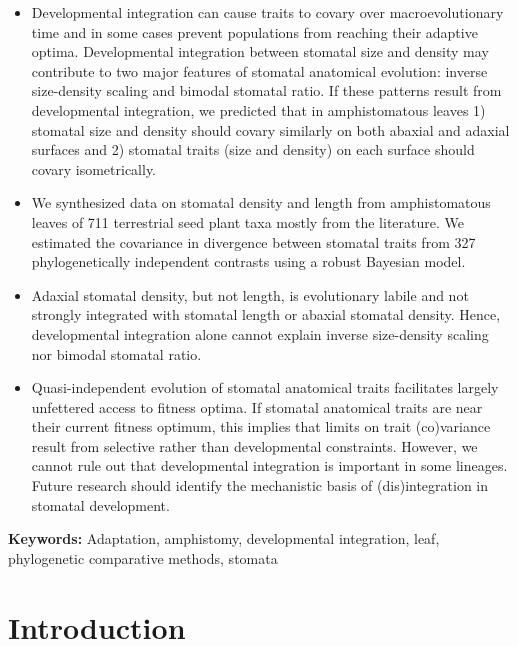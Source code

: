 \documentclass[
  10pt,
]{article}
\providecommand{\tightlist}{%
  \setlength{\itemsep}{0pt}\setlength{\parskip}{0pt}}
\begin{document}
\begin{itemize}
\tightlist
\item
  Developmental integration can cause traits to covary over macroevolutionary time and in some cases prevent populations from reaching their adaptive optima. Developmental integration between stomatal size and density may contribute to two major features of stomatal anatomical evolution: inverse size-density scaling and bimodal stomatal ratio. If these patterns result from developmental integration, we predicted that in amphistomatous leaves 1) stomatal size and density should covary similarly on both abaxial and adaxial surfaces and 2) stomatal traits (size and density) on each surface should covary isometrically.
\item
  We synthesized data on stomatal density and length from amphistomatous leaves of 711 terrestrial seed plant taxa mostly from the literature. We estimated the covariance in divergence between stomatal traits from 327 phylogenetically independent contrasts using a robust Bayesian model.
\item
  Adaxial stomatal density, but not length, is evolutionary labile and not strongly integrated with stomatal length or abaxial stomatal density. Hence, developmental integration alone cannot explain inverse size-density scaling nor bimodal stomatal ratio.
\item
  Quasi-independent evolution of stomatal anatomical traits facilitates largely unfettered access to fitness optima. If stomatal anatomical traits are near their current fitness optimum, this implies that limits on trait (co)variance result from selective rather than developmental constraints. However, we cannot rule out that developmental integration is important in some lineages. Future research should identify the mechanistic basis of (dis)integration in stomatal development.
\end{itemize}

\textbf{Keywords:} Adaptation, amphistomy, developmental integration, leaf, phylogenetic comparative methods, stomata

\linenumbers

\hypertarget{introduction}{%
\section{Introduction}\label{introduction}}
\end{document}

